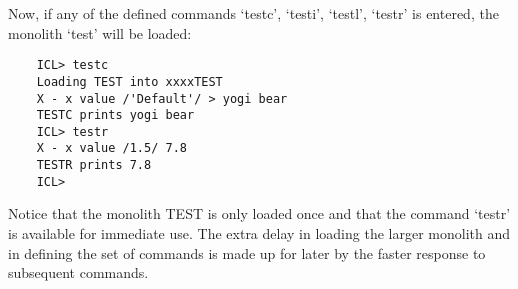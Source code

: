 Now, if any of the defined commands `testc', `testi', `testl', `testr' is
entered, the monolith `test' will be loaded:

\begin{small}
\begin{verbatim}
    ICL> testc
    Loading TEST into xxxxTEST
    X - x value /'Default'/ > yogi bear
    TESTC prints yogi bear
    ICL> testr
    X - x value /1.5/ 7.8
    TESTR prints 7.8
    ICL>
\end{verbatim}
\end{small}

Notice that the monolith TEST is only loaded once and that the command
`testr' is available for immediate use.
The extra delay in loading the larger monolith and in defining the
set of commands is made up for later by the faster response to subsequent
commands.
